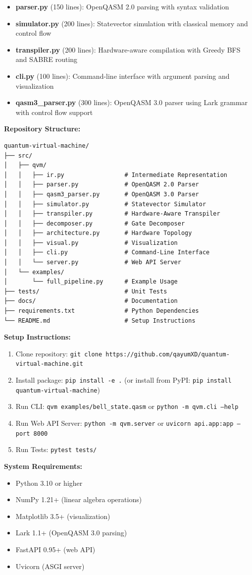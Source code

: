 \begin{itemize}
\item \textbf{parser.py} (150 lines): OpenQASM 2.0 parsing with syntax validation
\item \textbf{simulator.py} (200 lines): Statevector simulation with classical memory and control flow
\item \textbf{transpiler.py} (200 lines): Hardware-aware compilation with Greedy BFS and SABRE routing
\item \textbf{cli.py} (100 lines): Command-line interface with argument parsing and visualization
\item \textbf{qasm3\_parser.py} (300 lines): OpenQASM 3.0 parser using Lark grammar with control flow support
\end{itemize}

\vspace{1cm}

\textbf{Repository Structure:}
\begin{verbatim}
quantum-virtual-machine/
├── src/
│   ├── qvm/
│   │   ├── ir.py                 # Intermediate Representation
│   │   ├── parser.py             # OpenQASM 2.0 Parser
│   │   ├── qasm3_parser.py       # OpenQASM 3.0 Parser
│   │   ├── simulator.py          # Statevector Simulator
│   │   ├── transpiler.py         # Hardware-Aware Transpiler
│   │   ├── decomposer.py         # Gate Decomposer
│   │   ├── architecture.py       # Hardware Topology
│   │   ├── visual.py             # Visualization
│   │   ├── cli.py                # Command-Line Interface
│   │   └── server.py             # Web API Server
│   └── examples/
│       └── full_pipeline.py      # Example Usage
├── tests/                        # Unit Tests
├── docs/                         # Documentation
├── requirements.txt              # Python Dependencies
└── README.md                     # Setup Instructions
\end{verbatim}

\vspace{0.5cm}

\textbf{Setup Instructions:}
\begin{enumerate}
\item Clone repository: \texttt{git clone https://github.com/qayumXD/quantum-virtual-machine.git}
\item Install package: \texttt{pip install -e .} (or install from PyPI: \texttt{pip install quantum-virtual-machine})
\item Run CLI: \texttt{qvm examples/bell\_state.qasm} or \texttt{python -m qvm.cli --help}
\item Run Web API Server: \texttt{python -m qvm.server} or \texttt{uvicorn api.app:app --port 8000}
\item Run Tests: \texttt{pytest tests/}
\end{enumerate}

\vspace{0.5cm}

\textbf{System Requirements:}
\begin{itemize}
\item Python 3.10 or higher
\item NumPy 1.21+ (linear algebra operations)
\item Matplotlib 3.5+ (visualization)
\item Lark 1.1+ (OpenQASM 3.0 parsing)
\item FastAPI 0.95+ (web API)
\item Uvicorn (ASGI server)
\end{itemize}
